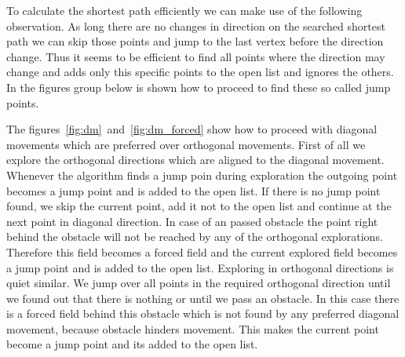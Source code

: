 \documentclass{article}
\begin{document}
    \begin{figure}[!htb]
        \centering
        \hfill
    \end{figure}
    

    To calculate the shortest path efficiently we can make use of the following observation. As long there are no changes in direction on the searched shortest path we can skip those points and jump to the last vertex before the direction change. Thus it seems to be efficient to find all points where the direction may change and adds only this specific points to the open list and ignores the others. In the figures group below is shown how to proceed to find these so called jump points. 
    
    The figures~\ref{fig:dm}~and~\ref{fig:dm_forced} show how to proceed with diagonal movements which are preferred over orthogonal movements. First of all we explore the orthogonal directions which are aligned to the diagonal movement. Whenever the algorithm finds a jump poin during exploration the outgoing point becomes a jump point and is added to the open list. If there is no jump point found, we skip the current point, add it not to the open list and continue at the next point in diagonal direction. In case of an passed obstacle the point right behind the obstacle will not be reached by any of the orthogonal explorations. Therefore this field becomes a forced field and the current explored field becomes a jump point and is added to the open list. Exploring in orthogonal directions is quiet similar. We jump over all points in the required orthogonal direction until we found out that there is nothing or until we pass an obstacle. In this case there is a forced field behind this obstacle which is not found by any preferred diagonal movement, because obstacle hinders movement. This makes the current point become a jump point and its added to the open list. 
    
\end{document}

